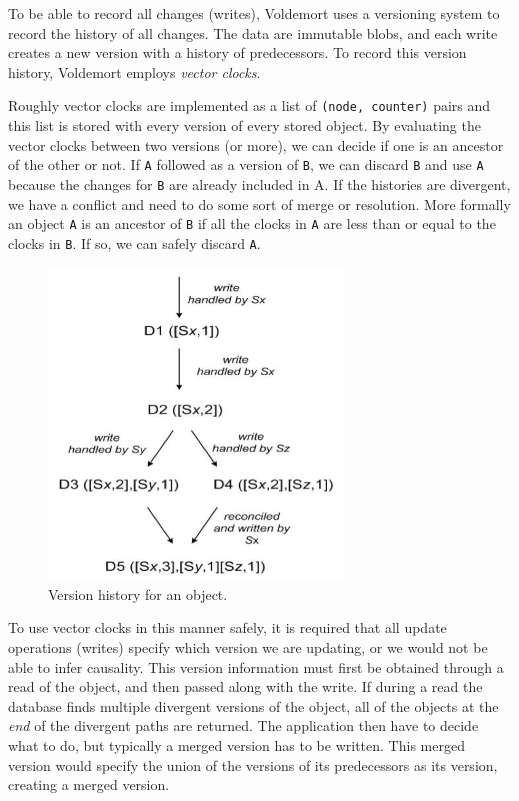 To be able to record all changes (writes), Voldemort uses a versioning system to record the history of all changes. The data are immutable blobs, and each write creates a new version with a history of predecessors.
To record this version history, Voldemort employs \emph{vector clocks}.

Roughly vector clocks are implemented as a list of \texttt{(node, counter)} pairs and this list is stored with every version of every stored object.
By evaluating the vector clocks between two versions (or more), we can decide if one is an ancestor of the other or not. If \texttt{A} followed as a version of \texttt{B}, we can discard \texttt{B} and use \texttt{A} because the changes for \texttt{B} are already included in A. 
If the histories are divergent, we have a conflict and need to do some sort of merge or resolution. More formally an object \texttt{A} is an ancestor of \texttt{B} if all the clocks in \texttt{A} are less than or equal to the clocks in \texttt{B}. 
If so, we can safely discard \texttt{A}.

\begin{figure}[h]
    \centering
    \includegraphics[width=0.7\textwidth]{background/figures/versioning}
    \caption{Version history for an object\cite{voldemort}.}
    \label{fig:versioning}
\end{figure}

To use vector clocks in this manner safely, it is required that all update operations (writes) specify which version we are updating, or we would not be able to infer causality.
This version information must first be obtained through a read of the object, and then passed along with the write.
If during a read the database finds multiple divergent versions of the object, all of the objects at the \emph{end} of the divergent paths are returned.
The application then have to decide what to do, but typically a merged version has to be written. This merged version would specify the union of the versions of its predecessors as its version, creating a merged version.

